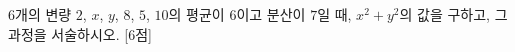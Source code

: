 $6$개의 변량 $2$, $x$, $y$, $8$, $5$, $10$의 평균이 $6$이고 분산이 $7$일 때, $x^2+y^2$의 값을 구하고, 그 과정을 서술하시오. \mbox{[6점]}
